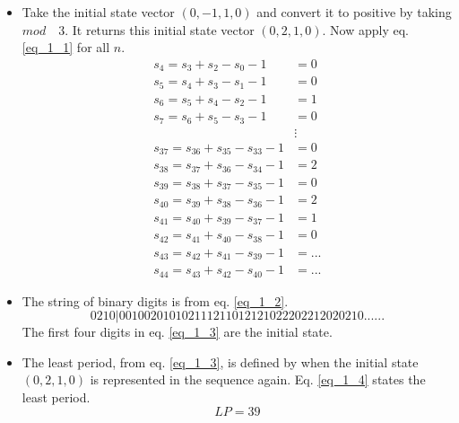 \documentclass[11pt]{article}
\begin{document}
\begin{itemize}
\item Take the initial state vector  $(0,-1,1,0)$ and convert it to positive by taking $mod \quad 3$. It returns this initial state vector  $(0,2,1,0)$. Now apply eq. \ref{eq_1_1} for all $n$.
\begin{equation}
\begin{align}
s_{4} = s_{3} + s_{2} - s_{0} -1 &= 0 \\
s_{5} = s_{4} + s_{3} - s_{1} -1 &= 0 \\
s_{6} = s_{5} + s_{4} - s_{2} -1 &= 1 \\
s_{7} = s_{6} + s_{5} - s_{3} -1 &= 0 \\
& \vdots \\
s_{37} = s_{36} + s_{35} - s_{33} -1 &= 0 \\
s_{38} = s_{37} + s_{36} - s_{34} -1 &= 2 \\
s_{39} = s_{38} + s_{37} - s_{35} -1 &= 0 \\
s_{40} = s_{39} + s_{38} - s_{36} -1 &= 2 \\
s_{41} = s_{40} + s_{39} - s_{37} -1 &= 1 \\
s_{42} = s_{41} + s_{40} - s_{38} -1 &= 0 \\
s_{43} = s_{42} + s_{41} - s_{39} -1 &= ... \\
s_{44} = s_{43} + s_{42} - s_{40} -1 &= ...
\end{align}
\label{eq_1_2}
\end{equation}
\item The string of binary digits is from eq. \ref{eq_1_2}.
\begin{equation}
0	2	1	0|0	0	1	0	0	2	0	1	0	1	0	2	1	1	1	2	1	1	0	1	2	1	2	1	0	2	2	2	0	2	2	1	2	0	2	0	2	1	0	... ...		
\label{eq_1_3}
\end{equation}
The first four digits in eq. \ref{eq_1_3} are the initial state. 
\item The least period, from eq. \ref{eq_1_3},  is defined by when the initial state $(0,2,1,0)$ is represented in the sequence again. Eq. \ref{eq_1_4} states the least period.
\begin{equation}
LP = 39
\label{eq_1_4}
\end{equation}
\end{itemize}
\end{document}
